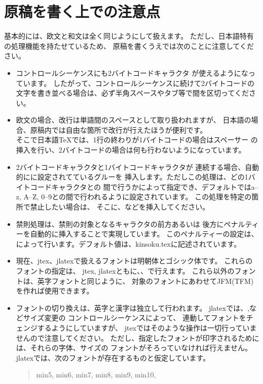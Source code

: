 \section{原稿を書く上での注意点}
基本的には、欧文と和文は全く同じようにして扱えます。
ただし、日本語特有の処理機能を持たせているため、
原稿を書くうえでは次のことに注意してください。
\begin{itemize}
\item コントロールシーケンスにも2バイトコードキャラクタ
	が使えるようになっています。
	したがって、コントロールシーケンスに続けて2バイトコードの
	文字を書き並べる場合は、必ず半角スペースやタブ等で間を区切ってください。
\item 欧文の場合、改行は単語間のスペースとして取り扱われますが、
	日本語の場合、原稿内では自由な箇所で改行が行えたほうが便利です。\\
	そこで日本語\TeX では、1行の終わりが1バイトコードの場合はスペーサー
	の挿入を行い、2バイトコードの場合は何も行わないようになっています。
\item 2バイトコードキャラクタと1バイトコードキャラクタが
	連続する場合、自動的にに設定されてているグルーを
	挿入します。ただしこの処理は、どの1バイトコードキャラクタとの
	間で行うかによって指定でき、デフォルトではa--z,
	A--Z, 0--9との間で行われるように設定されています。
	この処理を特定の箇所で禁止したい場合は、
	そこに、などを挿入してください。
\item 禁則処理は、禁則の対象となるキャラクタの前方あるいは
	後方にペナルティーを自動的に挿入することで実現しています。
	このペナルティーの設定は、
	によって行います。デフォルト値は、kinsoku.texに記述されています。
\item 現在、jtex、jlatexで扱えるフォントは明朝体とゴシック体です。
	これらのフォントの指定は、
	jtex, jlatexともに、、で行えます。
	これら以外のフォントは、英字フォントと同じように、
	対象のフォントにあわせてJFM(TFM)を作れば使用できます。
\item フォントの切り換えは、英字と漢字は独立して行われます。
	jlatexでは、,などサイズ変更の
	コントロールシーケンスによって、
	連動してフォントをチェンジするようにしていますが、
	jtexではそのような操作は一切行っていませんので注意してください。
	ただし、指定したフォントが印字されるためには、それらの字体、サイズの
	フォントがそろっていなければ行えません。
	jlatexでは、次のフォントが存在するものと仮定しています。
	\begin{quote}
	min5, min6, min7, min8, min9, min10,

\end{quote}
\end{itemize}
